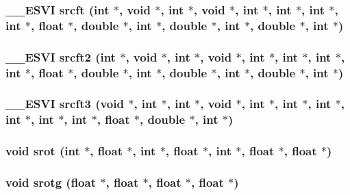 \subsubsection{\setlength{\rightskip}{0pt plus 5cm}\_\-\_\-ESVI srcft (int $\ast$, void $\ast$, int $\ast$, void $\ast$, int $\ast$, int $\ast$, int $\ast$, int $\ast$, float $\ast$, double $\ast$, int $\ast$, double $\ast$, int $\ast$, double $\ast$, int $\ast$)}\label{essl_8h_c5d30af63776c3f41223c8cbf5cc1152}


\subsubsection{\setlength{\rightskip}{0pt plus 5cm}\_\-\_\-ESVI srcft2 (int $\ast$, void $\ast$, int $\ast$, void $\ast$, int $\ast$, int $\ast$, int $\ast$, int $\ast$, float $\ast$, double $\ast$, int $\ast$, double $\ast$, int $\ast$, double $\ast$, int $\ast$)}\label{essl_8h_e6d164218bf24cf90893e06c193a8435}


\subsubsection{\setlength{\rightskip}{0pt plus 5cm}\_\-\_\-ESVI srcft3 (void $\ast$, int $\ast$, int $\ast$, void $\ast$, int $\ast$, int $\ast$, int $\ast$, int $\ast$, int $\ast$, int $\ast$, float $\ast$, double $\ast$, int $\ast$)}\label{essl_8h_0e13738b68fb060e20bdeedcf1dc363f}


\subsubsection{\setlength{\rightskip}{0pt plus 5cm}void srot (int $\ast$, float $\ast$, int $\ast$, float $\ast$, int $\ast$, float $\ast$, float $\ast$)}\label{essl_8h_78c193d0355489fea9df09e281377f5a}


\subsubsection{\setlength{\rightskip}{0pt plus 5cm}void srotg (float $\ast$, float $\ast$, float $\ast$, float $\ast$)}\label{essl_8h_c05b8d060d64ccc3ea4a7879975cf751}


